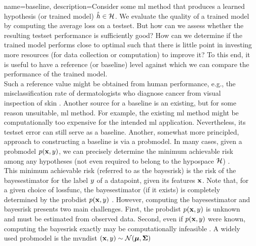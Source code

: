 {name={baseline},
    description={Consider some \gls{ml} method that produces a learned 
    	\gls{hypothesis} (or trained \gls{model}) $\hat{h} \in \mathcal{H}$. We evaluate the quality of a trained \gls{model} 
    	by computing the average \gls{loss} on a \gls{testset}. But how can we assess 
    	whether the resulting \gls{testset} performance is sufficiently good? How can we 
    	determine if the trained \gls{model} performs close to optimal such that there is little point 
   	in investing more resources (for \gls{data} collection or computation) to improve it? 
    	To this end, it is useful to have a reference (or baseline) level against which 
    	we can compare the performance of the trained \gls{model}. \\
	Such a reference value might be obtained from human performance, e.g., the misclassification rate of dermatologists 
    	who diagnose cancer from visual inspection of skin \cite{SkinHumanAI}. Another source for a baseline is an existing, 
    	but for some reason unsuitable, \gls{ml} method. For example, the existing \gls{ml} method 
    	might be computationally too expensive for the intended \gls{ml} application. 
    	Nevertheless, its \gls{testset} error can still serve as a baseline. Another, somewhat more principled, 
    	approach to constructing a baseline is via a \gls{probmodel}. In many cases, given a \gls{probmodel} $p({\bf x},y)$,  
    	we can precisely determine the \gls{minimum} achievable \gls{risk} among any hypotheses
    	(not even required to belong to the \gls{hypospace} $\mathcal{H}$) \cite{LC}. \\
    	This \gls{minimum} achievable \gls{risk} (referred to as the \gls{bayesrisk}) is the \gls{risk} 
    	of the \gls{bayesestimator} for the \gls{label} $y$ of a \gls{datapoint}, given
    	its \glspl{feature} ${\bf x}$. Note that, for a given choice of \gls{lossfunc}, the 
    	\gls{bayesestimator} (if it exists) is completely determined by the \gls{probdist} $p({\bf x},y)$ \cite[Ch. 4]{LC}. 
    	However, computing the \gls{bayesestimator} and \gls{bayesrisk} presents two 
    	main challenges. First, the \gls{probdist} $p({\bf x},y)$ is unknown and must be estimated from observed \gls{data}.
    	Second, even if $p({\bf x},y)$ were known, computing the \gls{bayesrisk} exactly may be computationally 
	infeasible \cite{cooper1990computational}. 
	A widely used \gls{probmodel} is the \gls{mvndist} $\left( {\bf x},y \right) \sim \mathcal{N}({\bm \mu},{\bm \Sigma})$ 
}}
